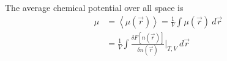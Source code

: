 \documentclass[double,12pt]{revtex4-2}
\begin{document}
The average chemical potential over all space is
\begin{align}
    \mu &= \left<\mu(\vec r)\right> = \frac{1}{V}\int \mu(\vec r)~d\vec r~\\
        &= \frac{1}{V} \int \frac{\delta F[n(\vec r)]}{\delta n(\vec r)}
           \bigg|_{T,V}~d\vec r~  
\end{align}
\end{document}
